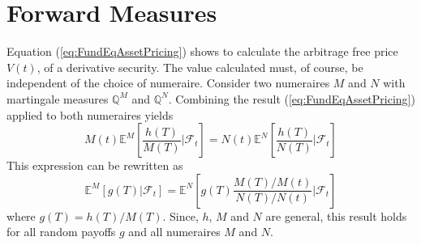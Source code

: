 \section{Forward Measures}
Equation (\ref{eq:FundEqAssetPricing}) shows to calculate the
arbitrage free price $V(t)$, of a derivative security. The value
calculated must, of course, be independent of the choice of
numeraire. Consider two numeraires $M$ and $N$ with martingale
measures $\mathbb{Q}^M$ and $\mathbb{Q}^N$. Combining the result
(\ref{eq:FundEqAssetPricing}) applied to both numeraires yields 
$$
M(t)\mathbb{E}^M\left[\frac{h(T)}{M(T)}
  \Big|\mathcal{F}_t\right]=N(t)\mathbb{E}^N\left[\frac{h(T)}{N(T)}
  \Big|\mathcal{F}_t\right] 
$$
This expression can be rewritten as
\begin{equation}
\label{eqChangeOfNumeraire:1}
\mathbb{E}^M\left[g(T) \Big|\mathcal{F}_t\right]=\mathbb{E}^N\left[
g(T)\frac{M(T)/M(t)}{N(T)/N(t)} \Big|\mathcal{F}_t\right]  
\end{equation}
where $g(T)=h(T)/M(T)$. Since, $h$, $M$ and $N$ are general, this
result holds for all random payoffs $g$ and all numeraires $M$ and
$N$.

